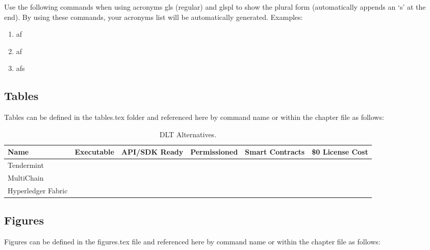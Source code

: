     Use the following commands when using acronyms gls (regular) and glspl to show the plural form (automatically appends an `s' at the end). By using these commands, your acronyms list will be automatically generated.
    Examples:
    \begin{enumerate}
        \item  \gls{af}
        \item  \gls{af}
        \item  \glspl{af}
    \end{enumerate}
    
    
\subsection{Tables}
    Tables can be defined in the tables.tex folder and referenced here by command name or within the chapter file as follows:
    \begin{table}[!h]
	\centering
	\small
	\caption{DLT Alternatives.}\label{table:DLTComparison}
	\begin{tabular}{>{\centering\arraybackslash}p{1.9cm}>{\centering\arraybackslash}p{1.9cm}>{\centering\arraybackslash}p{1.9cm}>{\centering\arraybackslash}p{2.2cm}>{\centering\arraybackslash}p{2.2cm}>{\centering\arraybackslash}p{2cm}}
		\toprule
		\textbf{Name}&\textbf{Executable}&\textbf{API/SDK Ready}&\textbf{Permissioned}&\textbf{Smart Contracts}&\textbf{\$0 License Cost} \\
		\midrule
		Tendermint & \checkmark  & \checkmark  & &  & \checkmark \\
		MultiChain & \checkmark & \checkmark& \checkmark &\checkmark  &  \\
		Hyperledger Fabric & \checkmark & \checkmark& \checkmark &  \checkmark & \checkmark \\
		\bottomrule
	\end{tabular}
    \end{table}
    
\subsection{Figures}
    Figures can be defined in the figures.tex file and referenced here by command name or within the chapter file as follows:
    \figtitlePage
    
